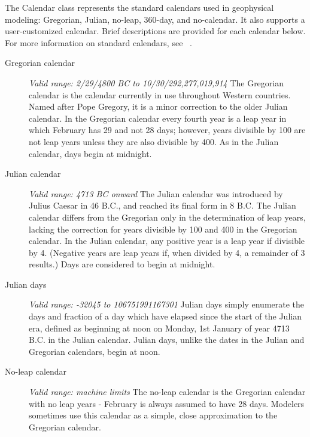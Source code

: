 
\label{sec:Calendar}
The Calendar class represents the standard calendars used in 
geophysical modeling:  Gregorian, Julian, no-leap, 360-day, and 
no-calendar.  It also supports a user-customized calendar.  Brief 
descriptions are provided for each calendar below.  For more information 
on standard calendars, see ~\cite{seidelman}.

\begin{description}            
\item[Gregorian calendar]
{\it Valid range: 2/29/4800 BC to 10/30/292,277,019,914 } \newline
The Gregorian calendar is the calendar currently in use throughout Western
countries.  Named after Pope Gregory, it is a minor 
correction to the older Julian calendar. In the Gregorian calendar every
fourth year is a leap year in which February has 29 and not 28 days;
however, years divisible by 100 are not leap years unless they are also 
divisible  by 400.  As in the Julian calendar, days begin at midnight.

\item[Julian calendar] 
{\it Valid range: 4713 BC onward} \newline
The Julian calendar was introduced by Julius Caesar in 46 B.C., and 
reached its final form in 8 B.C.  The Julian calendar differs from the 
Gregorian only in the determination of leap years, lacking the correction 
for years divisible
by 100 and 400 in the Gregorian calendar. In the Julian calendar, any positive 
year is a leap year if divisible by 4. (Negative years are leap years if, when 
divided by 4, a remainder of 3 results.) Days are considered to begin at 
midnight.

\item[Julian days]
{\it Valid range: -32045 to 106751991167301} \newline
Julian days simply enumerate the days and fraction of a day which have elapsed 
since the start of the Julian era, defined as beginning at noon on Monday, 
1st January of year 4713 B.C. in the Julian calendar.  Julian days, 
unlike the dates in the Julian and Gregorian calendars, begin at noon.

\item[No-leap calendar]
{\it Valid range: machine limits} \newline
The no-leap calendar is the Gregorian calendar with no leap years - 
February is always assumed to have 28 days.  Modelers sometimes use this 
calendar as a simple, close approximation to the Gregorian calendar.


\end{description}
